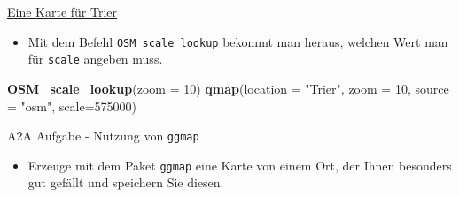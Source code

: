 \documentclass[ignorenonframetext,]{beamer}
\newenvironment{Shaded}{\begin{snugshade}}{\end{snugshade}}
\newcommand{\DataTypeTok}[1]{\textcolor[rgb]{0.13,0.29,0.53}{#1}}
\newcommand{\DecValTok}[1]{\textcolor[rgb]{0.00,0.00,0.81}{#1}}
\newcommand{\KeywordTok}[1]{\textcolor[rgb]{0.13,0.29,0.53}{\textbf{#1}}}
\newcommand{\NormalTok}[1]{#1}
\newcommand{\StringTok}[1]{\textcolor[rgb]{0.31,0.60,0.02}{#1}}
\providecommand{\tightlist}{%
  \setlength{\itemsep}{0pt}\setlength{\parskip}{0pt}}
\begin{document}
\begin{frame}[fragile]{\href{https://blog.dominodatalab.com/geographic-visualization-with-rs-ggmaps/}{Eine
Karte für Trier}}
\protect\hypertarget{eine-karte-fur-trier}{}

\begin{itemize}
\tightlist
\item
  Mit dem Befehl \texttt{OSM\_scale\_lookup} bekommt man heraus, welchen
  Wert man für \texttt{scale} angeben muss.
\end{itemize}

\begin{Shaded}
\begin{Highlighting}[]
\KeywordTok{OSM_scale_lookup}\NormalTok{(}\DataTypeTok{zoom =} \DecValTok{10}\NormalTok{)}
\KeywordTok{qmap}\NormalTok{(}\DataTypeTok{location =} \StringTok{"Trier"}\NormalTok{, }\DataTypeTok{zoom =} \DecValTok{10}\NormalTok{, }\DataTypeTok{source =} \StringTok{"osm"}\NormalTok{,}
     \DataTypeTok{scale=}\DecValTok{575000}\NormalTok{)}
\end{Highlighting}
\end{Shaded}

\end{frame}

\begin{frame}[fragile]{A2A Aufgabe - Nutzung von \texttt{ggmap}}
\protect\hypertarget{a2a-aufgabe---nutzung-von-ggmap}{}

\begin{itemize}
\tightlist
\item
  Erzeuge mit dem Paket \texttt{ggmap} eine Karte von einem Ort, der
  Ihnen besonders gut gefällt und speichern Sie diesen.
\end{itemize}

\end{frame}
\end{document}
